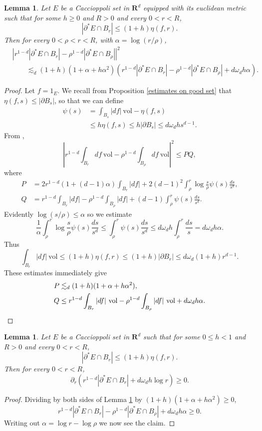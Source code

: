 \documentclass[reqno,12pt,letterpaper]{amsart}
\newcommand{\RR}{\mathbf{R}}
\newcommand{\vol}{\mathrm{vol}}
\newtheorem{lemma}[theorem]{Lemma}
\theoremstyle{definition}
\numberwithin{equation}{section}
\begin{document}
\begin{lemma}\label{approximate monotonicity}
Let $E$ be a Caccioppoli set in $\RR^d$ equipped with its euclidean metric such that for some $h \geq 0$ and $R > 0$ and every $0 < r < R$,
$$|\partial^* E \cap B_r| \leq (1 + h)\eta(f, r).$$
Then for every $0 < \rho < r < R$, with $\alpha = \log(r/\rho)$,
\begin{align*}
&\left|r^{1 - d} |\partial^* E \cap B_r| - \rho^{1 - d} |\partial^* E \cap B_\rho|\right|^2 \\
&\qquad \lesssim_d (1 + h)(1 + \alpha + h\alpha^2) \left(r^{1 - d} |\partial^* E \cap B_r| - \rho^{1 - d} |\partial^* E \cap B_\rho| + d\omega_d h \alpha\right).
\end{align*}
\end{lemma}
\begin{proof}
Let $f = 1_E$.
We recall from Proposition \ref{estimates on good set} that $\eta(f, s) \leq |\partial B_s|$, so that we can define
\begin{align*}
\psi(s) &= \int_{B_s} |df|~\vol - \eta(f, s)\\
&\leq h\eta(f, s) \leq h|\partial B_s| \leq d\omega_d hs^{d - 1}.
\end{align*}
From \cite[Proposition 5.12]{Giusti77},
$$\left|r^{1 - d} \int_{B_r} df ~\vol - \rho^{1 - d} \int_{B_\rho} df ~\vol\right|^2 \leq PQ,$$
where
\begin{align*}
P &= 2r^{1 - d}(1 + (d - 1)\alpha) \int_{B_r} |df| + 2(d - 1)^2 \int_\rho^r \log \frac{s}{\rho} \psi(s) \frac{ds}{s^d},\\
Q &= r^{1 - d} \int_{B_r} |df| - \rho^{1 - d} \int_{B_\rho} |df| + (d - 1)\int_\rho^r \psi(s) \frac{ds}{s^d}.
\end{align*}
Evidently $\log(s/\rho) \leq \alpha$ so we estimate
$$\frac{1}{\alpha} \int_\rho^r \log \frac{s}{\rho} \psi(s) \frac{ds}{s^d} \leq \int_\rho^r \psi(s) \frac{ds}{s^d} \leq d\omega_d h \int_\rho^r \frac{ds}{s} = d\omega_d h\alpha.$$
Thus
$$\int_{B_r} |df|~\vol \leq (1 + h)\eta(f, r) \leq (1 + h)|\partial B_r| \leq d\omega_d(1 + h) r^{d - 1}.$$
These estimates immediately give
\begin{align*}
P &\lesssim_d (1 + h)(1 + \alpha + h\alpha^2),\\
Q &\leq r^{1 - d} \int_{B_r} |df|~\vol - \rho^{1 - d} \int_{B_\rho} |df|~\vol + d\omega_d h\alpha. \qedhere
\end{align*}
\end{proof}

\begin{lemma}\label{approximate monotonicity 2}
Let $E$ be a Caccioppoli set in $\RR^d$ such that for some $0 \leq h < 1$ and $R > 0$ and every $0 < r < R$,
$$|\partial^* E \cap B_r| \leq (1 + h)\eta(f, r).$$
Then for every $0 < r < R$,
$$\partial_r \left(r^{1 - d} |\partial^* E \cap B_r| + d\omega_d h \log r\right) \geq 0.$$
\end{lemma}
\begin{proof}
Dividing by both sides of Lemma \ref{approximate monotonicity} by $(1 + h)(1 + \alpha + h\alpha^2) \geq 0$,
$$r^{1 - d} |\partial^* E \cap B_r| - \rho^{1 - d} |\partial^* E \cap B_\rho| + d\omega_d h \alpha \geq 0.$$
Writing out $\alpha = \log r - \log \rho$ we now see the claim.
\end{proof}
\end{document}
